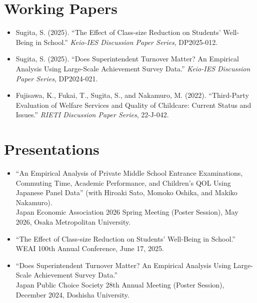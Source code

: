 \documentclass[11pt, a4paper]{article}
\begin{document}
\section{Working Papers}

\begin{itemize}
  \item Sugita, S. (2025). ``The Effect of Class-size Reduction on Students' Well-Being in School.'' \textit{Keio-IES Discussion Paper Series}, DP2025-012.

  \item Sugita, S. (2025). ``Does Superintendent Turnover Matter? An Empirical Analysis Using Large-Scale Achievement Survey Data.'' \textit{Keio-IES Discussion Paper Series}, DP2024-021.

  \item Fujisawa, K., Fukai, T., Sugita, S., and Nakamuro, M. (2022). ``Third-Party Evaluation of Welfare Services and Quality of Childcare: Current Status and Issues.'' \textit{RIETI Discussion Paper Series}, 22-J-042.
\end{itemize}

\section{Presentations}

\begin{itemize}
  \item ``An Empirical Analysis of Private Middle School Entrance Examinations, Commuting Time, Academic Performance, and Children's QOL Using Japanese Panel Data'' (with Hiroaki Sato, Momoko Oshika, and Makiko Nakamuro). \\
        Japan Economic Association 2026 Spring Meeting (Poster Session), May 2026, Osaka Metropolitan University.

  \item ``The Effect of Class-size Reduction on Students' Well-Being in School.'' \\
        WEAI 100th Annual Conference, June 17, 2025.

  \item ``Does Superintendent Turnover Matter? An Empirical Analysis Using Large-Scale Achievement Survey Data.'' \\
        Japan Public Choice Society 28th Annual Meeting (Poster Session), December 2024, Doshisha University.
\end{itemize}
\end{document}
